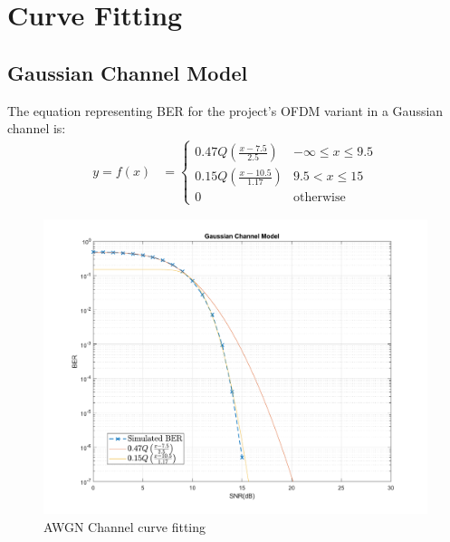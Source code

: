 \section{Curve Fitting}

\subsection{Gaussian Channel Model}
The equation representing BER for the project's OFDM variant in a Gaussian channel is:
\begin{align}
	y = f(x) &=
	\begin{cases}
		0.47Q \left(\frac{x - 7.5}{2.5}\right) & -\infty \leq x \leq 9.5 \\
		0.15Q \left(\frac{x - 10.5}{1.17}\right) & 9.5 < x \leq 15 \\
		0 & \text{otherwise}
	\end{cases}
\end{align}
\begin{figure}[htpb!]
    \centering
    \includegraphics[scale=0.6]{Graphics/Methodology/GaussCurveFit.pdf}
    \caption{AWGN Channel curve fitting}
    \label{fig:gaussCurveFit}
\end{figure}
\pagebreak

